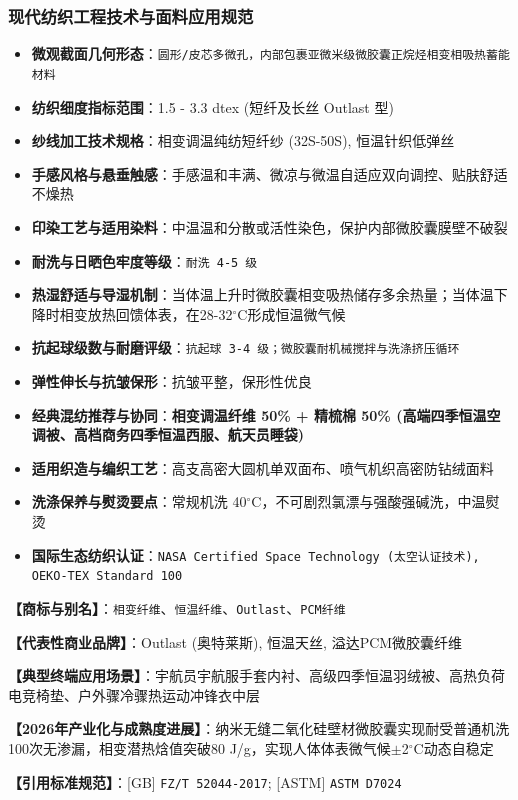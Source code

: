 \documentclass[11pt,openright,twoside,UTF8]{ctexbook}
\begin{document}
\subsubsection*{现代纺织工程技术与面料应用规范}
\begin{itemize} \setlength{\itemsep}{2pt}
    \item \textbf{微观截面几何形态}：\texttt{圆形/皮芯多微孔，内部包裹亚微米级微胶囊正烷烃相变相吸热蓄能材料}
    \item \textbf{纺织细度指标范围}：1.5 - 3.3 dtex (短纤及长丝 Outlast 型)
    \item \textbf{纱线加工技术规格}：相变调温纯纺短纤纱 (32S-50S), 恒温针织低弹丝
    \item \textbf{手感风格与悬垂触感}：手感温和丰满、微凉与微温自适应双向调控、贴肤舒适不燥热
    \item \textbf{印染工艺与适用染料}：中温温和分散或活性染色，保护内部微胶囊膜壁不破裂
    \item \textbf{耐洗与日晒色牢度等级}：\texttt{耐洗 4-5 级}
    \item \textbf{热湿舒适与导湿机制}：当体温上升时微胶囊相变吸热储存多余热量；当体温下降时相变放热回馈体表，在28-32$^\circ\mathrm{C}$形成恒温微气候
    \item \textbf{抗起球级数与耐磨评级}：\texttt{抗起球 3-4 级；微胶囊耐机械搅拌与洗涤挤压循环}
    \item \textbf{弹性伸长与抗皱保形}：抗皱平整，保形性优良
    \item \textbf{经典混纺推荐与协同}：\textbf{相变调温纤维 50\% + 精梳棉 50\% (高端四季恒温空调被、高档商务四季恒温西服、航天员睡袋)}
    \item \textbf{适用织造与编织工艺}：高支高密大圆机单双面布、喷气机织高密防钻绒面料
    \item \textbf{洗涤保养与熨烫要点}：常规机洗 40$^\circ\mathrm{C}$，不可剧烈氯漂与强酸强碱洗，中温熨烫
    \item \textbf{国际生态纺织认证}：\texttt{NASA Certified Space Technology (太空认证技术), OEKO-TEX Standard 100}
\end{itemize}
\vspace{0.2cm}

\noindent\textbf{【商标与别名】}：\texttt{相变纤维}、\texttt{恒温纤维}、\texttt{Outlast}、\texttt{PCM纤维}\par
\noindent\textbf{【代表性商业品牌】}：Outlast (奥特莱斯), 恒温天丝, 溢达PCM微胶囊纤维\par
\noindent\textbf{【典型终端应用场景】}：宇航员宇航服手套内衬、高级四季恒温羽绒被、高热负荷电竞椅垫、户外骤冷骤热运动冲锋衣中层\par
\noindent\textbf{【2026年产业化与成熟度进展】}：纳米无缝二氧化硅壁材微胶囊实现耐受普通机洗100次无渗漏，相变潜热焓值突破80 J/g，实现人体体表微气候$\pm$2$^\circ\mathrm{C}$动态自稳定\par
\noindent\textbf{【引用标准规范】}：[GB] \texttt{FZ/T 52044-2017}; [ASTM] \texttt{ASTM D7024}\par
\vspace{0.5cm}
\end{document}
